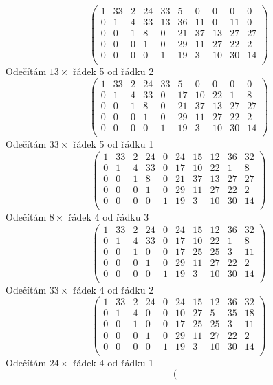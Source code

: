 \documentclass[a4paper,12pt]{report}
\begin{document}
\begin{itemize}
$$\left(\begin{array}{cccccccccc}
1&33&2&24&33&5&0&0&0&0\\
0&1&4&33&13&36&11&0&11&0\\
0&0&1&8&0&21&37&13&27&27\\
0&0&0&1&0&29&11&27&22&2\\
0&0&0&0&1&19&3&10&30&14\\
\end{array}\right)$$
Odečítám \(13\times\) řádek 5 od řádku 2
$$\left(\begin{array}{cccccccccc}
1&33&2&24&33&5&0&0&0&0\\
0&1&4&33&0&17&10&22&1&8\\
0&0&1&8&0&21&37&13&27&27\\
0&0&0&1&0&29&11&27&22&2\\
0&0&0&0&1&19&3&10&30&14\\
\end{array}\right)$$
Odečítám \(33\times\) řádek 5 od řádku 1
$$\left(\begin{array}{cccccccccc}
1&33&2&24&0&24&15&12&36&32\\
0&1&4&33&0&17&10&22&1&8\\
0&0&1&8&0&21&37&13&27&27\\
0&0&0&1&0&29&11&27&22&2\\
0&0&0&0&1&19&3&10&30&14\\
\end{array}\right)$$
Odečítám \(8\times\) řádek 4 od řádku 3
$$\left(\begin{array}{cccccccccc}
1&33&2&24&0&24&15&12&36&32\\
0&1&4&33&0&17&10&22&1&8\\
0&0&1&0&0&17&25&25&3&11\\
0&0&0&1&0&29&11&27&22&2\\
0&0&0&0&1&19&3&10&30&14\\
\end{array}\right)$$
Odečítám \(33\times\) řádek 4 od řádku 2
$$\left(\begin{array}{cccccccccc}
1&33&2&24&0&24&15&12&36&32\\
0&1&4&0&0&10&27&5&35&18\\
0&0&1&0&0&17&25&25&3&11\\
0&0&0&1&0&29&11&27&22&2\\
0&0&0&0&1&19&3&10&30&14\\
\end{array}\right)$$
Odečítám \(24\times\) řádek 4 od řádku 1
$$\left(\begin{array}{cccccccccc}

\end{array}$$
\end{itemize}
\end{document}
